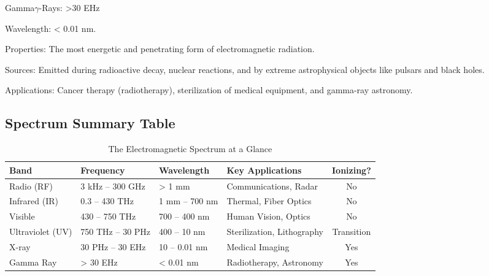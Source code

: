 \begin{spectrumband}{Gamma}{$\gamma$-Rays: >30 EHz}
    \item[Wavelength:] < 0.01 nm.
    \item[Properties:] The most energetic and penetrating form of electromagnetic radiation.
    \item[Sources:] Emitted during radioactive decay, nuclear reactions, and by extreme astrophysical objects like pulsars and black holes.
    \item[Applications:] Cancer therapy (radiotherapy), sterilization of medical equipment, and gamma-ray astronomy.
\end{spectrumband}

\subsection{Spectrum Summary Table}
\begin{table}[H]
    \centering
    \caption{The Electromagnetic Spectrum at a Glance}
    \label{tab:spectrum-summary}
    \begin{tabularx}{\textwidth}{@{}llXXc@{}}
        \toprule
        \tableheaderfont Band & \tableheaderfont Frequency & \tableheaderfont Wavelength & \tableheaderfont Key Applications & \tableheaderfont Ionizing? \\
        \midrule
        Radio (RF) & 3 kHz -- 300 GHz & > 1 mm & Communications, Radar & No \\
        Infrared (IR) & 0.3 -- 430 THz & 1 mm -- 700 nm & Thermal, Fiber Optics & No \\
        Visible & 430 -- 750 THz & 700 -- 400 nm & Human Vision, Optics & No \\
        Ultraviolet (UV) & 750 THz -- 30 PHz & 400 -- 10 nm & Sterilization, Lithography & Transition \\
        X-ray & 30 PHz -- 30 EHz & 10 -- 0.01 nm & Medical Imaging & Yes \\
        Gamma Ray & > 30 EHz & < 0.01 nm & Radiotherapy, Astronomy & Yes \\
        \bottomrule
    \end{tabularx}
\end{table}

